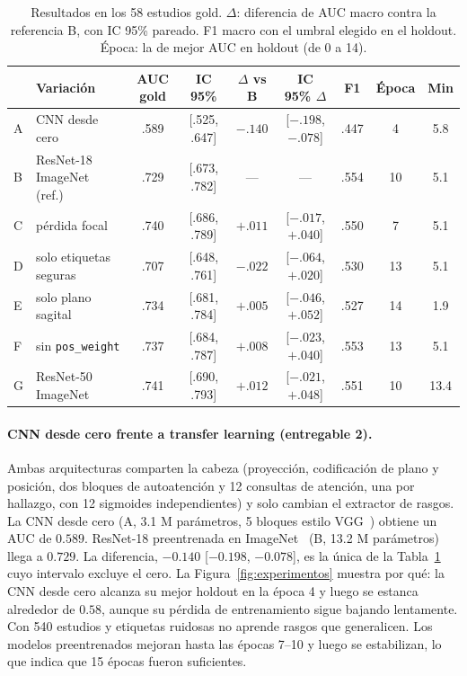 \begin{table}[t]
  \caption{Resultados en los 58 estudios gold. $\Delta$: diferencia de AUC macro contra la referencia B, con IC 95\% pareado.
    F1 macro con el umbral elegido en el holdout. Época: la de mejor AUC en holdout (de 0 a 14).}
  \label{tab:experimentos}
  \centering
  \small
  \setlength{\tabcolsep}{4pt}
  \begin{tabular}{@{}llccccccc@{}}
    \toprule
    & Variación & AUC gold & IC 95\% & $\Delta$ vs B & IC 95\% $\Delta$ & F1 & Época & Min \\
    \midrule
    A & CNN desde cero         & .589 & [.525, .647] & $-.140$ & [$-.198$, $-.078$] & .447 &  4 &  5.8 \\
    B & ResNet-18 ImageNet (ref.) & .729 & [.673, .782] & ---  & ---                  & .554 & 10 &  5.1 \\
    C & pérdida focal          & .740 & [.686, .789] & $+.011$ & [$-.017$, $+.040$] & .550 &  7 &  5.1 \\
    D & solo etiquetas seguras & .707 & [.648, .761] & $-.022$ & [$-.064$, $+.020$] & .530 & 13 &  5.1 \\
    E & solo plano sagital     & .734 & [.681, .784] & $+.005$ & [$-.046$, $+.052$] & .527 & 14 &  1.9 \\
    F & sin \texttt{pos\_weight} & .737 & [.684, .787] & $+.008$ & [$-.023$, $+.040$] & .553 & 13 &  5.1 \\
    G & ResNet-50 ImageNet     & .741 & [.690, .793] & $+.012$ & [$-.021$, $+.048$] & .551 & 10 & 13.4 \\
    \bottomrule
  \end{tabular}
\end{table}

\paragraph{CNN desde cero frente a transfer learning (entregable 2).}
Ambas arquitecturas comparten la cabeza (proyección, codificación de plano y posición, dos bloques de autoatención y 12 consultas de atención, una por hallazgo, con 12 sigmoides independientes) y solo cambian el extractor de rasgos.
La CNN desde cero (A, 3.1 M parámetros, 5 bloques estilo VGG~\cite{simonyan2015vgg}) obtiene un AUC de $0.589$.
ResNet-18 preentrenada en ImageNet~\cite{he2016resnet} (B, 13.2 M parámetros) llega a $0.729$.
La diferencia, $-0.140$ [$-0.198$, $-0.078$], es la única de la Tabla~\ref{tab:experimentos} cuyo intervalo excluye el cero.
La Figura~\ref{fig:experimentos} muestra por qué: la CNN desde cero alcanza su mejor holdout en la época 4 y luego se estanca alrededor de $0.58$, aunque su pérdida de entrenamiento sigue bajando lentamente.
Con 540 estudios y etiquetas ruidosas no aprende rasgos que generalicen.
Los modelos preentrenados mejoran hasta las épocas 7--10 y luego se estabilizan, lo que indica que 15 épocas fueron suficientes.

